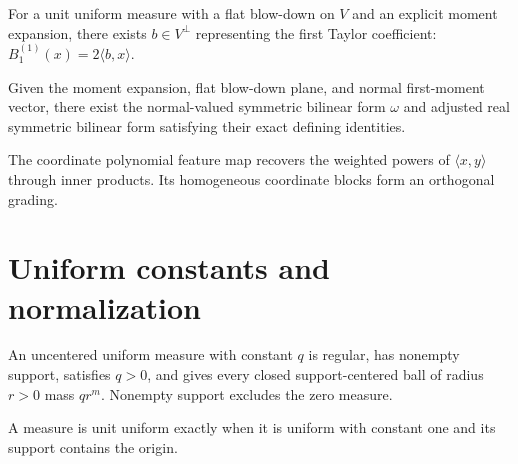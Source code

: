 \begin{lemma}
\label{lem:rigidity-normal-vector-exists}
For a unit uniform measure with a flat blow-down on $V$ and an explicit moment expansion, there exists $b\in V^\perp$ representing the first Taylor coefficient: $B_1^{(1)}(x)=2\langle b,x\rangle$.
\end{lemma}

\begin{lemma}
\label{lem:rigidity-forms-exist}
Given the moment expansion, flat blow-down plane, and normal first-moment vector, there exist the normal-valued symmetric bilinear form $\omega$ and adjusted real symmetric bilinear form satisfying their exact defining identities.
\end{lemma}

\begin{lemma}
\label{lem:polynomial-feature-identities}
The coordinate polynomial feature map recovers the weighted powers of $\langle x,y\rangle$ through inner products. Its homogeneous coordinate blocks form an orthogonal grading.
\end{lemma}

\section{Uniform constants and normalization}

\begin{definition}
\label{def:uniform-constant}
An uncentered uniform measure with constant $q$ is regular, has nonempty support, satisfies $q>0$, and gives every closed support-centered ball of radius $r>0$ mass $qr^m$. Nonempty support excludes the zero measure.
\end{definition}

\begin{lemma}
\label{lem:uniform-constant-one}
A measure is unit uniform exactly when it is uniform with constant one and its support contains the origin.
\end{lemma}

